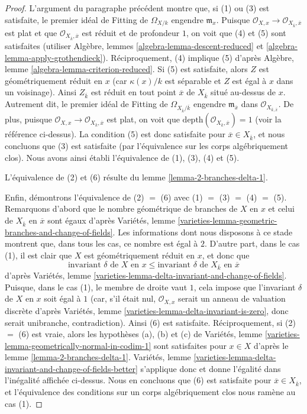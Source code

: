 \begin{proof}
\medskip\noindent
L'argument du paragraphe précédent montre que, si (1) ou (3) est satisfaite, le premier idéal de Fitting de $\Omega_{X/k}$ engendre $\mathfrak m_x$. Puisque $\mathcal{O}_{X, x} \to \mathcal{O}_{X_{\overline{k}}, \overline{x}}$ est plat et que $\mathcal{O}_{X_{\overline{k}}, \overline{x}}$ est réduit et de profondeur $1$, on voit que (4) et (5) sont satisfaites (utiliser Algèbre, lemmes \ref{algebra-lemma-descent-reduced} et \ref{algebra-lemma-apply-grothendieck}). Réciproquement, (4) implique (5) d'après Algèbre, lemme \ref{algebra-lemma-criterion-reduced}. Si (5) est satisfaite, alors $Z$ est géométriquement réduit en $x$ (car $\kappa(x)/k$ est séparable et $Z$ est égal à $x$ dans un voisinage). Ainsi $Z_{\overline{k}}$ est réduit en tout point $\overline{x}$ de $X_{\overline{k}}$ situé au-dessus de $x$. Autrement dit, le premier idéal de Fitting de $\Omega_{X_{\overline{k}}/\overline{k}}$ engendre $\mathfrak m_{\overline{x}}$ dans $\mathcal{O}_{X_{\overline{k}, \overline{x}}}$. De plus, puisque $\mathcal{O}_{X, x} \to \mathcal{O}_{X_{\overline{k}}, \overline{x}}$ est plat, on voit que $\text{depth}(\mathcal{O}_{X_{\overline{k}}, \overline{x}}) = 1$ (voir la référence ci-dessus). La condition (5) est donc satisfaite pour $\overline{x} \in X_{\overline{k}}$, et nous concluons que (3) est satisfaite (par l'équivalence sur les corps algébriquement clos). Nous avons ainsi établi l'équivalence de (1), (3), (4) et (5).

\medskip\noindent
L'équivalence de (2) et (6) résulte du lemme \ref{lemma-2-branches-delta-1}.

\medskip\noindent
Enfin, démontrons l'équivalence de (2) $=$ (6) avec (1) $=$ (3) $=$ (4) $=$ (5). Remarquons d'abord que le nombre géométrique de branches de $X$ en $x$ et celui de $X_{\overline{k}}$ en $\overline{x}$ sont égaux d'après Variétés, lemme \ref{varieties-lemma-geometric-branches-and-change-of-fields}. Les informations dont nous disposons à ce stade montrent que, dans tous les cas, ce nombre est égal à $2$. D'autre part, dans le cas (1), il est clair que $X$ est géométriquement réduit en $x$, et donc que $$
\text{invariant }\delta\text{ de }X\text{ en }x \leq
\text{invariant }\delta\text{ de }X_{\overline{k}}\text{ en }\overline{x}
$$ d'après Variétés, lemme \ref{varieties-lemma-delta-invariant-and-change-of-fields}. Puisque, dans le cas (1), le membre de droite vaut $1$, cela impose que l'invariant $\delta$ de $X$ en $x$ soit égal à $1$ (car, s'il était nul, $\mathcal{O}_{X, x}$ serait un anneau de valuation discrète d'après Variétés, lemme \ref{varieties-lemma-delta-invariant-is-zero}, donc serait unibranche, contradiction). Ainsi (6) est satisfaite. Réciproquement, si (2) $=$ (6) est vraie, alors les hypothèses (a), (b) et (c) de Variétés, lemme \ref{varieties-lemma-geometrically-normal-in-codim-1} sont satisfaites pour $x \in X$ d'après le lemme \ref{lemma-2-branches-delta-1}. Variétés, lemme \ref{varieties-lemma-delta-invariant-and-change-of-fields-better} s'applique donc et donne l'égalité dans l'inégalité affichée ci-dessus. Nous en concluons que (6) est satisfaite pour $\overline{x} \in X_{\overline{k}}$, et l'équivalence des conditions sur un corps algébriquement clos nous ramène au cas (1).
\end{proof}

